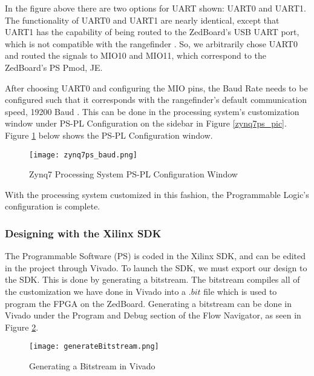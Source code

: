 In the figure above there are two options for UART shown: UART0 and UART1. The functionality of UART0 and UART1 are nearly identical, except that UART1 has the capability of being routed to the ZedBoard's USB UART port, which is not compatible with the rangefinder \cite{zedboard_datasheet}. So, we arbitrarily chose UART0 and routed the signals to MIO10 and MIO11, which correspond to the ZedBoard's PS Pmod, JE.
\par
After choosing UART0 and configuring the MIO pins, the Baud Rate needs to be configured such that it corresponds with the rangefinder's default communication speed, 19200 Baud \cite{urg04lx_datasheet}. This can be done in the processing system's customization window under PS-PL Configuration on the sidebar in Figure \ref{zynq7ps_pic}. Figure \ref{zynq7ps_baud_pic} below shows the PS-PL Configuration window.

\begin{figure}[H]
	\centerline{\texttt{[image: zynq7ps\_baud.png]}}
	\caption{Zynq7 Processing System PS-PL Configuration Window}
	\label{zynq7ps_baud_pic}
\end{figure}

With the processing system customized in this fashion, the Programmable Logic's configuration is complete.

\subsubsection{Designing with the Xilinx SDK}
The Programmable Software (PS) is coded in the Xilinx SDK, and can be edited in the project through Vivado. To launch the SDK, we must export our design to the SDK. This is done by generating a bitstream. The bitstream compiles all of the customization we have done in Vivado into a $.bit$ file which is used to program the FPGA on the ZedBoard. Generating a bitstream can be done in Vivado under the Program and Debug section of the Flow Navigator, as seen in Figure \ref{generateBitstream}.

\begin{figure}[H]
	\centerline{\texttt{[image: generateBitstream.png]}}
	\caption{Generating a Bitstream in Vivado}
	\label{generateBitstream}
\end{figure}

